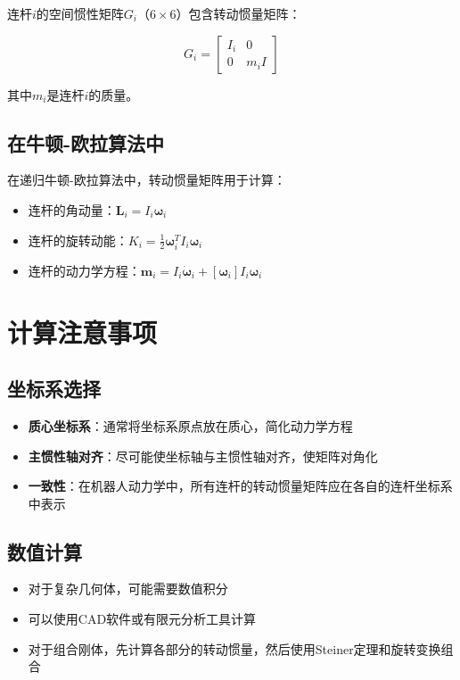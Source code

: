 \documentclass[12pt,a4paper]{article}
\begin{document}
连杆$i$的空间惯性矩阵$G_i$（$6 \times 6$）包含转动惯量矩阵：

\begin{equation}
G_i = \begin{bmatrix}
I_i & 0 \\
0 & m_i I
\end{bmatrix}
\end{equation}

其中$m_i$是连杆$i$的质量。

\subsection{在牛顿-欧拉算法中}

在递归牛顿-欧拉算法中，转动惯量矩阵用于计算：
\begin{itemize}
\item 连杆的角动量：$\bm{L}_i = I_i \bm{\omega}_i$
\item 连杆的旋转动能：$K_i = \frac{1}{2} \bm{\omega}_i^T I_i \bm{\omega}_i$
\item 连杆的动力学方程：$\bm{m}_i = I_i \dot{\bm{\omega}}_i + [\bm{\omega}_i] I_i \bm{\omega}_i$
\end{itemize}

\section{计算注意事项}

\subsection{坐标系选择}

\begin{itemize}
\item \textbf{质心坐标系}：通常将坐标系原点放在质心，简化动力学方程
\item \textbf{主惯性轴对齐}：尽可能使坐标轴与主惯性轴对齐，使矩阵对角化
\item \textbf{一致性}：在机器人动力学中，所有连杆的转动惯量矩阵应在各自的连杆坐标系中表示
\end{itemize}

\subsection{数值计算}

\begin{itemize}
\item 对于复杂几何体，可能需要数值积分
\item 可以使用CAD软件或有限元分析工具计算
\item 对于组合刚体，先计算各部分的转动惯量，然后使用Steiner定理和旋转变换组合
\end{itemize}
\end{document}
